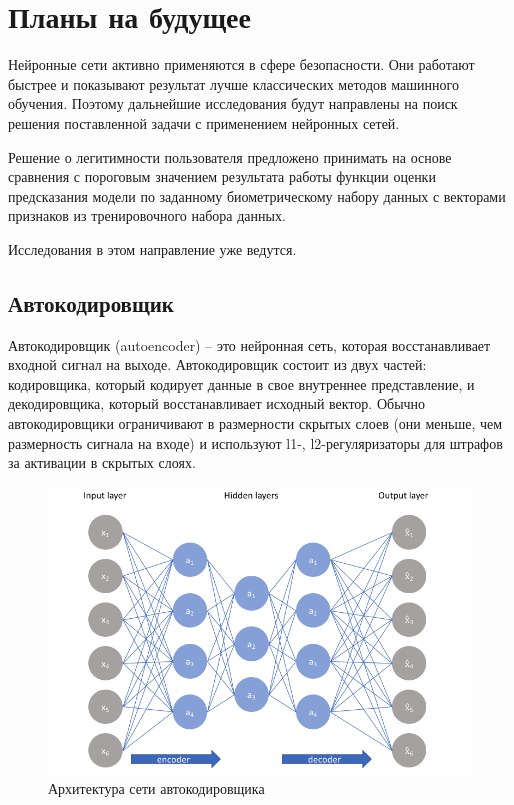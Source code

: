 \documentclass[12pt]{article}
\begin{document}
    \newpage



    \section{Планы на будущее}
    \label{sec:Future}

    \par Нейронные сети активно применяются в сфере безопасности. Они работают быстрее и показывают результат лучше классических методов машинного обучения. Поэтому дальнейшие исследования будут направлены на поиск решения поставленной задачи с применением нейронных сетей.

    \par Решение о легитимности пользователя предложено принимать на основе сравнения с пороговым значением результата работы функции оценки предсказания модели по заданному биометрическому набору данных с векторами признаков из тренировочного набора данных.

    \par Исследования в этом направление уже ведутся.


    \subsection{Автокодировщик}
    \label{sec:Future:Autoencoder}

    \par Автокодировщик (autoencoder) \cite{autoencoder} -- это нейронная сеть, которая восстанавливает входной сигнал на выходе. Автокодировщик состоит из двух частей: кодировщика, который кодирует данные в свое внутреннее представление, и декодировщика, который восстанавливает исходный вектор. Обычно автокодировщики ограничивают в размерности скрытых слоев (они меньше, чем размерность сигнала на входе) и используют l1-, l2-регуляризаторы для штрафов за активации в скрытых слоях.

    \begin{figure}[h!]
        \centering
        \includegraphics[width=0.9\linewidth]{autoencoder.png}
        \caption{Архитектура сети автокодировщика}
        \label{sec:Future:autoencoder:fig:autoencoder}
    \end{figure}
\end{document}
